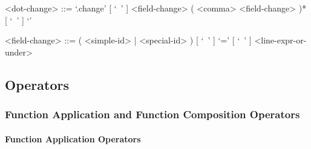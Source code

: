 \documentclass{article}
\begin{document}
\begin{itemize}
\begin{grammar}
<dot-change> ::=
`.change{' [ `\ ' ] <field-change> ( <comma> <field-change> )* [ `\ ' ] `}'

<field-change> ::=
( <simple-id> | <special-id> ) [ `\ ' ] `=' [ `\ ' ] <line-expr-or-under>
\end{grammar}

\end{itemize}

\subsection{Operators}

\subsubsection{Function Application and Function Composition Operators}

\paragraph{Function Application Operators}
\end{document}

